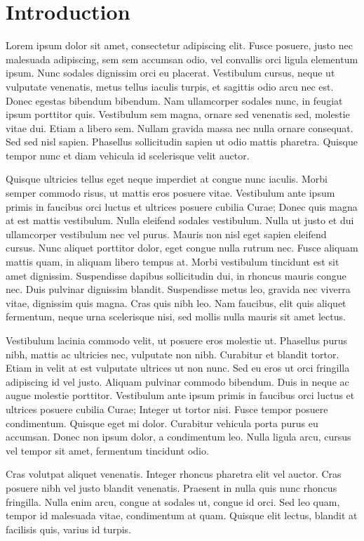 \chapter{Introduction}

Lorem ipsum dolor sit amet, consectetur adipiscing elit. Fusce posuere, justo nec malesuada adipiscing, sem sem accumsan odio, vel convallis orci ligula elementum ipsum. Nunc sodales dignissim orci eu placerat. Vestibulum cursus, neque ut vulputate venenatis, metus tellus iaculis turpis, et sagittis odio arcu nec est. Donec egestas bibendum bibendum. Nam ullamcorper sodales nunc, in feugiat ipsum porttitor quis. Vestibulum sem magna, ornare sed venenatis sed, molestie vitae dui. Etiam a libero sem. Nullam gravida massa nec nulla ornare consequat. Sed sed nisl sapien. Phasellus sollicitudin sapien ut odio mattis pharetra. Quisque tempor nunc et diam vehicula id scelerisque velit auctor.

Quisque ultricies tellus eget neque imperdiet at congue nunc iaculis. Morbi semper commodo risus, ut mattis eros posuere vitae. Vestibulum ante ipsum primis in faucibus orci luctus et ultrices posuere cubilia Curae; Donec quis magna at est mattis vestibulum. Nulla eleifend sodales vestibulum. Nulla ut justo et dui ullamcorper vestibulum nec vel purus. Mauris non nisl eget sapien eleifend cursus. Nunc aliquet porttitor dolor, eget congue nulla rutrum nec. Fusce aliquam mattis quam, in aliquam libero tempus at. Morbi vestibulum tincidunt est sit amet dignissim. Suspendisse dapibus sollicitudin dui, in rhoncus mauris congue nec. Duis pulvinar dignissim blandit. Suspendisse metus leo, gravida nec viverra vitae, dignissim quis magna. Cras quis nibh leo. Nam faucibus, elit quis aliquet fermentum, neque urna scelerisque nisi, sed mollis nulla mauris sit amet lectus.

Vestibulum lacinia commodo velit, ut posuere eros molestie ut. Phasellus purus nibh, mattis ac ultricies nec, vulputate non nibh. Curabitur et blandit tortor. Etiam in velit at est vulputate ultrices ut non nunc. Sed eu eros ut orci fringilla adipiscing id vel justo. Aliquam pulvinar commodo bibendum. Duis in neque ac augue molestie porttitor. Vestibulum ante ipsum primis in faucibus orci luctus et ultrices posuere cubilia Curae; Integer ut tortor nisi. Fusce tempor posuere condimentum. Quisque eget mi dolor. Curabitur vehicula porta purus eu accumsan. Donec non ipsum dolor, a condimentum leo. Nulla ligula arcu, cursus vel tempor sit amet, fermentum tincidunt odio.

Cras volutpat aliquet venenatis. Integer rhoncus pharetra elit vel auctor. Cras posuere nibh vel justo blandit venenatis. Praesent in nulla quis nunc rhoncus fringilla. Nulla enim arcu, congue at sodales ut, congue id orci. Sed leo quam, tempor id malesuada vitae, condimentum at quam. Quisque elit lectus, blandit at facilisis quis, varius id turpis.


